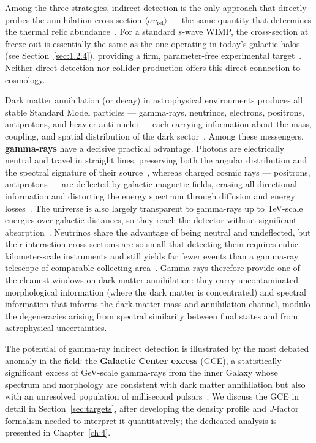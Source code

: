 Among the three strategies, indirect detection is the only approach that directly probes the annihilation cross-section $\langle \sigma v_\text{rel} \rangle$ --- the same quantity that determines the thermal relic abundance~\cite{Hooper:2024}.
For a standard $s$-wave WIMP, the cross-section at freeze-out is essentially the same as the one operating in today's galactic halos (see Section~\ref{sec:1.2.4}), providing a firm, parameter-free experimental target~\cite{Steigman:2012nb,Hooper:2024}.
Neither direct detection nor collider production offers this direct connection to cosmology.

Dark matter annihilation (or decay) in astrophysical environments produces all stable Standard Model particles --- gamma-rays, neutrinos, electrons, positrons, antiprotons, and heavier anti-nuclei --- each carrying information about the mass, coupling, and spatial distribution of the dark sector~\cite{Cirelli:2010xx,Arina:2023eic,Cirelli:2024ssz}.
Among these messengers, \textbf{gamma-rays} have a decisive practical advantage.
Photons are electrically neutral and travel in straight lines, preserving both the angular distribution and the spectral signature of their source~\cite{Cirelli:2024ssz,Pinetti:2021jjs}, whereas charged cosmic rays --- positrons, antiprotons --- are deflected by galactic magnetic fields, erasing all directional information and distorting the energy spectrum through diffusion and energy losses~\cite{Cirelli:2024ssz}.
The universe is also largely transparent to gamma-rays up to TeV-scale energies over galactic distances, so they reach the detector without significant absorption~\cite{Hooper:2024}.
Neutrinos share the advantage of being neutral and undeflected, but their interaction cross-sections are so small that detecting them requires cubic-kilometer-scale instruments and still yields far fewer events than a gamma-ray telescope of comparable collecting area~\cite{Cirelli:2024ssz}.
Gamma-rays therefore provide one of the cleanest windows on dark matter annihilation: they carry uncontaminated morphological information (where the dark matter is concentrated) and spectral information that informs the dark matter mass and annihilation channel, modulo the degeneracies arising from spectral similarity between final states and from astrophysical uncertainties.

The potential of gamma-ray indirect detection is illustrated by the most debated anomaly in the field: the \textbf{Galactic Center excess} (GCE), a statistically significant excess of GeV-scale gamma-rays from the inner Galaxy whose spectrum and morphology are consistent with dark matter annihilation but also with an unresolved population of millisecond pulsars~\cite{Goodenough:2009gk,Hooper:2010mq,Daylan:2014rsa,Macias:2019omb}.
We discuss the GCE in detail in Section~\ref{sec:targets}, after developing the density profile and $J$-factor formalism needed to interpret it quantitatively; the dedicated analysis is presented in Chapter~\ref{ch:4}.

